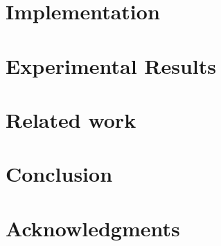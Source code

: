 \documentclass[sigconf]{acmart}
\begin{document}
\section{Implementation}
\label{sec:impl}



\section{Experimental Results}
\label{sec:results}


\section{Related work}
\label{sec:related}


\section{Conclusion}
\label{sec:conclusion}


\section*{Acknowledgments}


 
\end{document}
